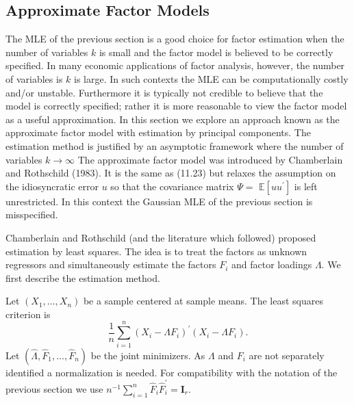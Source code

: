 \documentclass[10pt]{article}
\begin{document}
\subsection{Approximate Factor Models}
The MLE of the previous section is a good choice for factor estimation when the number of variables $k$ is small and the factor model is believed to be correctly specified. In many economic applications of factor analysis, however, the number of variables is $k$ is large. In such contexts the MLE can be computationally costly and/or unstable. Furthermore it is typically not credible to believe that the model is correctly specified; rather it is more reasonable to view the factor model as a useful approximation. In this section we explore an approach known as the approximate factor model with estimation by principal components. The estimation method is justified by an asymptotic framework where the number of variables $k \rightarrow \infty$ The approximate factor model was introduced by Chamberlain and Rothschild (1983). It is the same as (11.23) but relaxes the assumption on the idiosyncratic error $u$ so that the covariance matrix $\Psi=$ $\mathbb{E}\left[u u^{\prime}\right]$ is left unrestricted. In this context the Gaussian MLE of the previous section is misspecified.

Chamberlain and Rothschild (and the literature which followed) proposed estimation by least squares. The idea is to treat the factors as unknown regressors and simultaneously estimate the factors $F_{i}$ and factor loadings $\Lambda$. We first describe the estimation method.

Let $\left(X_{1}, \ldots, X_{n}\right)$ be a sample centered at sample means. The least squares criterion is
$$
\frac{1}{n} \sum_{i=1}^{n}\left(X_{i}-\Lambda F_{i}\right)^{\prime}\left(X_{i}-\Lambda F_{i}\right) .
$$
Let $\left(\widehat{\Lambda}, \widehat{F}_{1}, \ldots, \widehat{F}_{n}\right)$ be the joint minimizers. As $\Lambda$ and $F_{i}$ are not separately identified a normalization is needed. For compatibility with the notation of the previous section we use $n^{-1} \sum_{i=1}^{n} \widehat{F}_{i} \widehat{F}_{i}^{\prime}=\boldsymbol{I}_{r}$.
\end{document}
